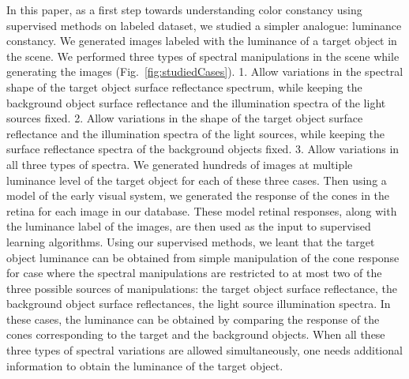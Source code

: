 \documentclass{jov}
\begin{document}
In this paper, as a first step towards understanding color constancy using supervised methods on labeled dataset, we studied a simpler analogue: luminance constancy. We generated images labeled with the luminance of a target object in the scene. We performed three types of spectral manipulations in the scene while generating the images (Fig.~\ref{fig:studiedCases}). 1. Allow variations in the spectral shape of the target object surface reflectance spectrum, while keeping the background object surface reflectance and the illumination spectra of the light sources fixed. 2. Allow variations in the shape of the target object surface reflectance and the illumination spectra of the light sources, while keeping the surface reflectance spectra of the background objects fixed. 3. Allow variations in all three types of spectra. We generated hundreds of images at multiple luminance level of the target object for each of these three cases. Then using a model of the early visual system, we generated the response of the cones in the retina for each image in our database. These model retinal responses, along with the luminance label of the images, are then used as the input to supervised learning algorithms. Using our supervised methods, we leant that the target object luminance can be obtained from simple manipulation of the cone response for case where the spectral manipulations are restricted to at most two of the three possible sources of manipulations: the target object surface reflectance, the background object surface reflectances, the light source illumination spectra. In these cases, the luminance can be obtained by comparing the response of the cones corresponding to the target and the background objects. When all these three types of spectral variations are allowed simultaneously, one needs additional information to obtain the luminance of the target object. 



\end{document}
